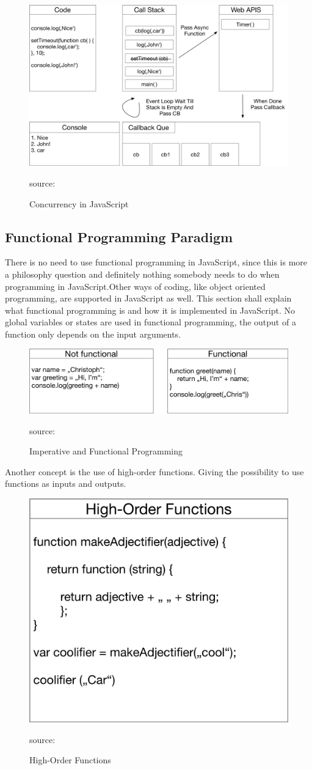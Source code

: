 \begin{figure}[H]
	\centering
	\includegraphics[width=0.8\linewidth]{bilder/grundlagen/Concurrency.png}
	\caption{Concurrency in JavaScript} source:\cite{Concurrency}
	\label{fig:CC}
\end{figure}

\subsection{Functional Programming Paradigm}
There is no need to use functional programming in JavaScript, since this is more a philosophy question and definitely nothing somebody needs to do when programming in JavaScript.Other ways of coding, like object oriented programming, are supported in JavaScript as well. This section shall explain what functional programming is and how it is implemented in JavaScript. No global variables or states are used in functional programming, the output of a function only depends on the input arguments.

\begin{figure}[H]
	\centering
	\includegraphics[width=0.8\linewidth]{bilder/grundlagen/fp.png}
	\caption{Imperative and Functional Programming} source:\cite{FP}
	\label{fig:FP}
\end{figure}

Another concept is the use of high-order functions. Giving the possibility to use functions as inputs and outputs. 


\begin{figure}[H]
	\centering
	\includegraphics[width=0.5\linewidth]{bilder/grundlagen/fp1.png}
	\caption{High-Order Functions} source:\cite{HF}
	\label{fig:HF}
\end{figure}

